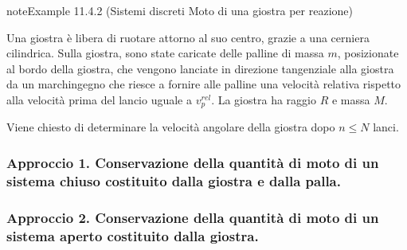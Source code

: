 \documentclass[letterpaper,10pt,italian]{jupyterBook}
\begin{document}
\begin{sphinxadmonition}{note}{Example 11.4.2 (Sistemi discreti \sphinxhyphen{} Moto di una giostra per reazione)}



\sphinxAtStartPar
Una giostra è libera di ruotare attorno al suo centro, grazie a una cerniera cilindrica. Sulla giostra, sono state caricate delle palline di massa \(m\), posizionate al bordo della giostra, che vengono lanciate in direzione tangenziale alla giostra da un marchingegno che riesce a fornire alle palline una velocità relativa rispetto alla velocità prima del lancio uguale a \(v_p^{rel}\). La giostra ha raggio \(R\) e massa \(M\).



\sphinxAtStartPar
Viene chiesto di determinare la velocità angolare della giostra dopo \(n \le N\) lanci.  

\sphinxAtStartPar
{}  
\subsubsection*{Approccio 1. Conservazione della quantità di moto di un sistema chiuso costituito dalla giostra e dalla palla.}
\subsubsection*{Approccio 2. Conservazione della quantità di moto di un sistema aperto costituito dalla giostra.}


\end{sphinxadmonition}
\end{document}
